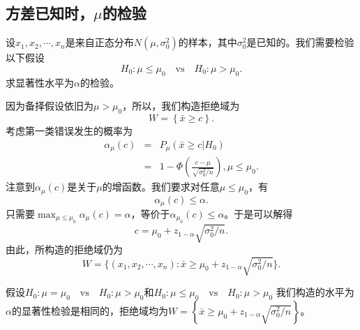\subsection{方差已知时，$\mu$的检验}
\begin{example}
    设$x_1,x_2,\cdots,x_n$是来自正态分布$N(\mu,\sigma_0^2)$的样本，其中$\sigma_0^2$是已知的。我们需要检验以下假设
    $$
    H_0: \mu \leq \mu_0 \quad \text{vs} \quad H_0: \mu > \mu_0.    $$
    求显著性水平为$\alpha$的检验。
\end{example}
\begin{solution}
    因为备择假设依旧为$\mu > \mu_0$，所以，我们构造拒绝域为
    $$
    W = \left\{\bar{x} \geq c\right\}.
    $$
    考虑第一类错误发生的概率为
    \begin{eqnarray*}
        \alpha_{\mu}(c) &=& P_{\mu}(\bar{x} \geq c|H_0) \\
        &=& 1-\Phi\left(\frac{c-\mu}{\sqrt{\sigma_0^2/n}}\right) , \mu \leq \mu_0.
    \end{eqnarray*}
    注意到$ \alpha_{\mu}(c)$是关于$\mu$的增函数。我们要求对任意$\mu\leq \mu_0$，有
    $$
    \alpha_{\mu}(c) \leq \alpha.
    $$
    只需要$\max_{\mu \leq \mu_0}\alpha_{\mu}(c)= \alpha$，等价于$\alpha_{\mu_0}(c)\leq \alpha$。于是可以解得
    $$
    c = \mu_0 + z_{1-\alpha}\sqrt{\sigma_0^2/n}.
    $$
    由此，所构造的拒绝域仍为
    $$
     W = \{(x_1,x_2,\cdots,x_n): \bar{x} \geq  \mu_0 + z_{1-\alpha} \sqrt{\sigma_0^2/n}\}.
    $$
\end{solution}
\begin{remark}
    假设$
    H_0: \mu = \mu_0 \quad \text{vs} \quad H_0: \mu > \mu_0$和$
    H_0: \mu \leq \mu_0 \quad \text{vs} \quad H_0: \mu > \mu_0$
    我们构造的水平为$\alpha$的显著性检验是相同的，拒绝域均为$W = \left\{ \bar{x} \geq  \mu_0 + z_{1-\alpha} \sqrt{\sigma_0^2/n} \right\}$。
\end{remark}
